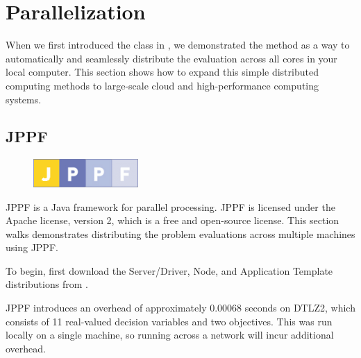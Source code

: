 %
%

\chapter{Parallelization}
\label{chpt:parallelization}
When we first introduced the  class in , we demonstrated the  method as a way to automatically and seamlessly distribute the evaluation across all cores in your local computer.  This section shows how to expand this simple distributed computing methods to large-scale cloud and high-performance computing systems.

\section{JPPF}
\begin{figure}
  \includegraphics[width=4cm]{jppf.png}
\end{figure}
JPPF is a Java framework for parallel processing.  JPPF is licensed under the Apache license, version 2, which is a free and open-source license.  This section walks demonstrates distributing the problem evaluations across multiple machines using JPPF.

To begin, first download the Server/Driver, Node, and Application Template distributions from .  

JPPF introduces an overhead of approximately 0.00068 seconds on DTLZ2, which consists of 11 real-valued decision variables and two objectives.  This was run locally on a single machine, so running across a network will incur additional overhead.

